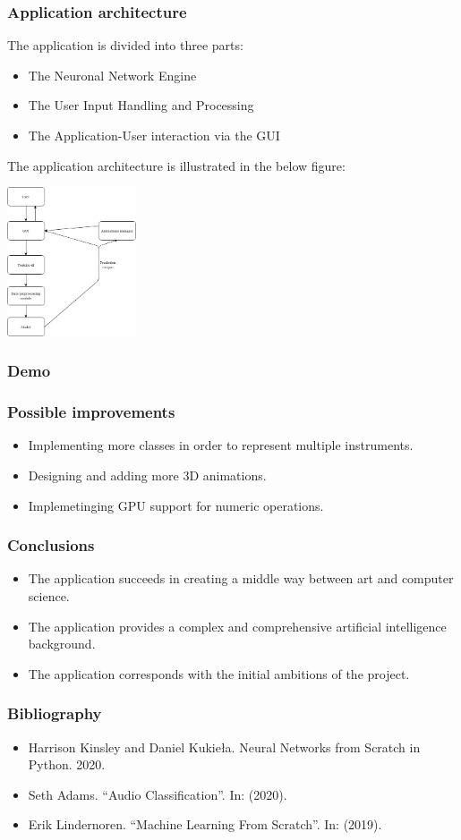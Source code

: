 \documentclass{beamer}
\begin{document}
\begin{frame}
\frametitle{Application architecture}
The application is divided into three parts:
\begin{itemize}
	\item The Neuronal Network Engine
	\item The User Input Handling and Processing
	\item The Application-User interaction via the GUI
\end{itemize}
The application architecture is illustrated in the below figure:
\begin{center}
	\centering
	\includegraphics[width = 1.5in]{images/fac.png}
	\centerline{}
	\label{uc1}
	\end{center}
\end{frame}
\begin{frame}
\frametitle{Demo}
\end{frame}

\begin{frame}
\frametitle{Possible improvements}

\begin{itemize}
	\item Implementing more classes in order to represent multiple instruments.
	\item Designing and adding more 3D animations.
	\item Implemetinging GPU support for numeric operations.
\end{itemize}
\end{frame}

\begin{frame}
\frametitle{Conclusions}
\begin{itemize}
	\item The application succeeds in creating a middle way between art and computer science.
	\item The application provides a complex and comprehensive artificial intelligence background.
	\item The application corresponds with the initial ambitions of the project.
\end{itemize}
\end{frame}

\begin{frame}
\frametitle{Bibliography}
\begin{itemize}
	\item Harrison Kinsley and Daniel Kukieła. Neural Networks from Scratch in Python.
2020.
	\item Seth Adams. “Audio Classification”. In: (2020).

	\item Erik Lindernoren. “Machine Learning From Scratch”. In: (2019).

\end{itemize}
\end{frame}
\end{document}
